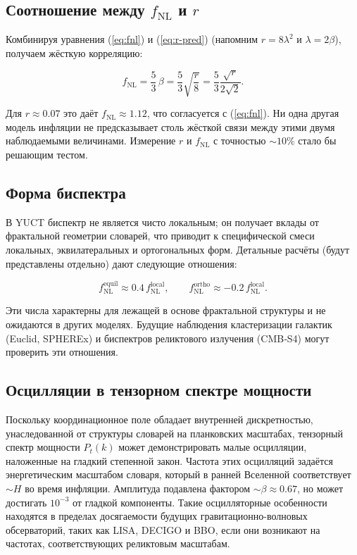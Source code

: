 \documentclass[12pt,a4paper]{article}
\theoremstyle{remark}
\begin{document}
	\subsection{Соотношение между $f_{\text{NL}}$ и $r$}
	
	Комбинируя уравнения (\ref{eq:fnl}) и (\ref{eq:r-pred}) (напомним $r = 8\lambda^2$ и $\lambda = 2\beta$), получаем жёсткую корреляцию:
	
	\begin{equation}
		f_{\text{NL}} = \frac{5}{3}\,\beta = \frac{5}{3}\sqrt{\frac{r}{8}} = \frac{5}{3}\frac{\sqrt{r}}{2\sqrt{2}}.
		\label{eq:fnl-r}
	\end{equation}
	
	Для $r \approx 0.07$ это даёт $f_{\text{NL}} \approx 1.12$, что согласуется с (\ref{eq:fnl}). Ни одна другая модель инфляции не предсказывает столь жёсткой связи между этими двумя наблюдаемыми величинами. Измерение $r$ и $f_{\text{NL}}$ с точностью $\sim 10\%$ стало бы решающим тестом.
	
	\subsection{Форма биспектра}
	
	В YUCT биспектр не является чисто локальным; он получает вклады от фрактальной геометрии словарей, что приводит к специфической смеси локальных, эквилатеральных и ортогональных форм. Детальные расчёты (будут представлены отдельно) дают следующие отношения:
	
	\begin{equation}
		f_{\text{NL}}^{\text{equil}} \approx 0.4\, f_{\text{NL}}^{\text{local}}, \qquad
		f_{\text{NL}}^{\text{ortho}} \approx -0.2\, f_{\text{NL}}^{\text{local}}.
		\label{eq:fnl-shapes}
	\end{equation}
	
	Эти числа характерны для лежащей в основе фрактальной структуры и не ожидаются в других моделях. Будущие наблюдения кластеризации галактик (Euclid, SPHEREx) и биспектров реликтового излучения (CMB‑S4) могут проверить эти отношения.
	
	\subsection{Осцилляции в тензорном спектре мощности}
	
	Поскольку координационное поле обладает внутренней дискретностью, унаследованной от структуры словарей на планковских масштабах, тензорный спектр мощности $P_t(k)$ может демонстрировать малые осцилляции, наложенные на гладкий степенной закон. Частота этих осцилляций задаётся энергетическим масштабом словаря, который в ранней Вселенной соответствует $\sim H$ во время инфляции. Амплитуда подавлена фактором $\sim \beta \approx 0.67$, но может достигать $10^{-3}$ от гладкой компоненты. Такие осцилляторные особенности находятся в пределах досягаемости будущих гравитационно-волновых обсерваторий, таких как LISA, DECIGO и BBO, если они возникают на частотах, соответствующих реликтовым масштабам.
	
\end{document}
